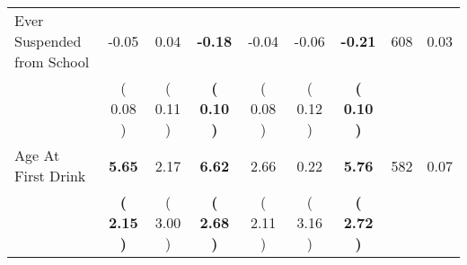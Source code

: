 \begin{tabular}{lcccccccc}
Ever Suspended from School &     -0.05 &      0.04 & \textbf{    -0.18} &     -0.04 &     -0.06 & \textbf{    -0.21} & 608 &       0.03 \\ 
 & (     0.08 ) & (     0.11 ) & \textbf{(     0.10 )} & (     0.08 ) & (     0.12 ) & \textbf{(     0.10 )} & \\
Age At First Drink & \textbf{     5.65} &      2.17 & \textbf{     6.62} &      2.66 &      0.22 & \textbf{     5.76} & 582 &       0.07 \\ 
 & \textbf{(     2.15 )} & (     3.00 ) & \textbf{(     2.68 )} & (     2.11 ) & (     3.16 ) & \textbf{(     2.72 )} & \\
\bottomrule
\end{tabular}
